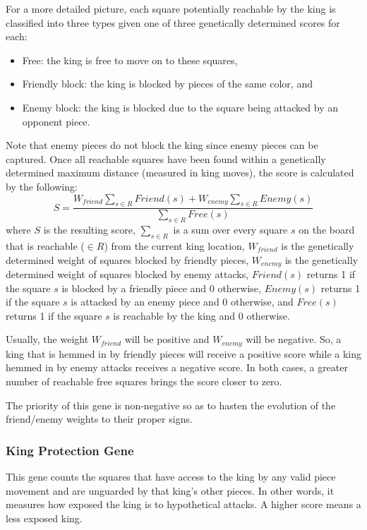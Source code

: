 \documentclass[letterpaper]{article}
\renewcommand{\_}{\allowbreak\textunderscore\allowbreak}
\begin{document}
For a more detailed picture, each square potentially reachable by the king is classified into three types given one of three genetically determined scores for each:
\begin{itemize}
	\item Free: the king is free to move on to these squares,
	\item Friendly block: the king is blocked by pieces of the same color, and
	\item Enemy block: the king is blocked due to the square being attacked by an opponent piece.
\end{itemize}
Note that enemy pieces do not block the king since enemy pieces can be captured. Once all reachable squares have been found within a genetically determined maximum distance (measured in king moves), the score is calculated by the following:
\[S = \frac{W_{friend}\sum_{s \in R}Friend(s) + W_{enemy}\sum_{s \in R}Enemy(s)}{\sum_{s \in R}Free(s)}
\]
where \(S\) is the resulting score, \(\sum_{s \in R}\) is a sum over every square \(s\) on the board that is reachable (\(\in R\)) from the current king location, \(W_{friend}\) is the genetically determined weight of squares blocked by friendly pieces, \(W_{enemy}\) is the genetically determined weight of squares blocked by enemy attacks, \(Friend(s)\) returns 1 if the square \(s\) is blocked by a friendly piece and 0 otherwise, \(Enemy(s)\) returns 1 if the square \(s\) is attacked by an enemy piece and 0 otherwise, and \(Free(s)\) returns 1 if the square \(s\) is reachable by the king and 0 otherwise.

Usually, the weight \(W_{friend}\) will be positive and \(W_{enemy}\) will be negative. So, a king that is hemmed in by friendly pieces will receive a positive score while a king hemmed in by enemy attacks receives a negative score. In both cases, a greater number of reachable free squares brings the score closer to zero.

The priority of this gene is non-negative so as to hasten the evolution of the friend/enemy weights to their proper signs.

\subsubsection{King Protection Gene}
This gene counts the squares that have access to the king by any valid piece movement and are unguarded by that king's other pieces. In other words, it measures how exposed the king is to hypothetical attacks. A higher score means a less exposed king.
\end{document}
